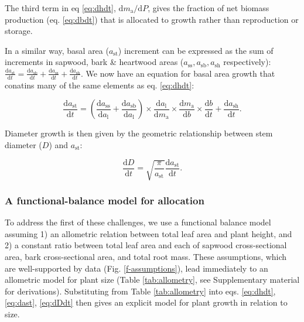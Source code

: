 \documentclass[12pt, a4paper]{article}
\begin{document}
The third term in eq \ref{eq:dhdt},
$\textrm{d}m_\textrm{a} / \textrm{d}P$, gives the fraction of net
biomass production (eq. \ref{eq:dbdt}) that is allocated to growth
rather than reproduction or storage.

In a similar way, basal area ($a_\textrm{st}$) increment can be
expressed as the sum of increments in sapwood, bark \& heartwood areas
($a_\textrm{ss}, a_\textrm{sb}, a_\textrm{sh}$ respectively):
$\frac{\textrm{d}a_\textrm{st}}{\textrm{d}t}= \frac{\textrm{d}a_\textrm{sb}}{\textrm{d}t} + \frac{\textrm{d}a_\textrm{ss}}{\textrm{d}t} + \frac{\textrm{d}a_\textrm{sh}}{\textrm{d}t}$.
We now have an equation for basal area growth that conatins many of the same
elements as eq. \ref{eq:dhdt}:

\begin{equation}\label{eq:dast}
\frac{\textrm{d}a_\textrm{st}}{\textrm{d}t}=
\left(\frac{\textrm{d}a_\textrm{ss}}{\textrm{d}a_\textrm{l}} + \frac{\textrm{d}a_\textrm{sb}}{\textrm{d}a_\textrm{l}}\right) \times
\frac{\textrm{d}a_\textrm{l}}{\textrm{d}m_\textrm{a}} \times \frac{\textrm{d}m_\textrm{a}}{\textrm{d}b} \times \frac{\textrm{d}b}{\textrm{d}t} +\frac{\textrm{d}a_\textrm{sh}}{\textrm{d}t} .
\end{equation}

Diameter growth is then given by the geometric relationship between stem
diameter ($D$) and $a_\textrm{st}$:

\begin{equation} \label{eq:dDdt}
\frac{\textrm{d}D}{\textrm{d}t}= \sqrt{\frac{\pi}{a_\textrm{st}}} \frac{\textrm{d}a_\textrm{st}}{\textrm{d}t}.
\end{equation}

\subsubsection{A functional-balance model for allocation}

To address the first of these challenges, we use a functional balance
model \citep{yokozawa-1995,falster-2011} assuming
1) an allometric relation between total leaf area and plant height, and
2) a constant ratio between total leaf area and each of sapwood
cross-sectional area, bark cross-sectional area, and total root mass.
These assumptions, which are well-supported by data (Fig.
\ref{f-assumptions}), lead immediately to an allometric model for plant
size (Table \ref{tab:allometry}, see Supplementary material for
derivations). Substituting from Table \ref{tab:allometry} into eqs.
\ref{eq:dhdt}, \ref{eq:dast}, \ref{eq:dDdt} then gives an explicit model
for plant growth in relation to size.
\end{document}
